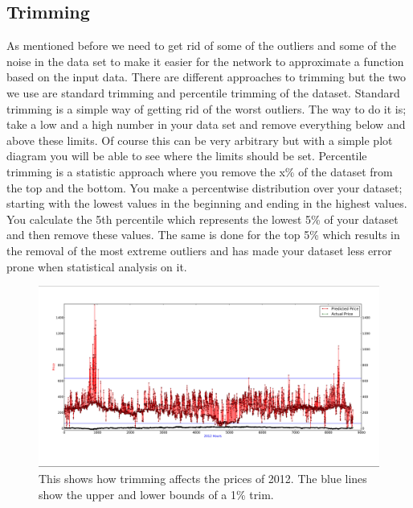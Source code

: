 \subsection{Trimming}\label{sec:Trimming}
As mentioned before we need to get rid of some of the outliers and some of the noise in the data set to make it easier for the network to approximate a function based on the input data. There are different approaches to trimming but the two we use are standard trimming and percentile trimming of the dataset. Standard trimming is a simple way of getting rid of the worst outliers. The way to do it is; take a low and a high number in your data set and remove everything below and above these limits. Of course this can be very arbitrary but with a simple plot diagram you will be able to see where the limits should be set. Percentile trimming is a statistic approach where you remove the x\% of the dataset from the top and the bottom. You make a percentwise distribution over your dataset; starting with the lowest values in the beginning and ending in the highest values. You calculate the 5th percentile which represents the lowest 5\% of your dataset and then remove these values. The same is done for the top 5\% which results in the removal of the most extreme outliers and has made your dataset less error prone when statistical analysis on it.
\begin{figure}[!ht]
\centering
\includegraphics[width=\linewidth,natwidth=898,natheight=587]{billeder/trimming_graph.jpg}
\caption{This shows how trimming affects the prices of 2012. The blue lines show the upper and lower bounds of a 1\% trim.}
\label{fig:trimming_in_trimming_section}
\end{figure}


